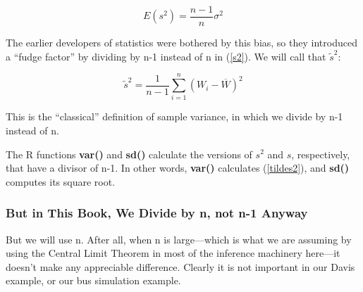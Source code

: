 % 
% 
% 
% 
% 
\begin{equation}
E(s^2) = \frac{n-1}{n} \sigma^2
\end{equation}


The earlier developers of statistics were bothered by this bias, so they
introduced a ``fudge factor'' by dividing by n-1 instead of n in
(\ref{s2}).  We will call that $\tilde{s}^2$:

\begin{equation}
\label{tildes2}
\tilde{s}^2 = 
\frac{1}{n-1} \sum_{i=1}^{n} (W_i-\overline{W})^2 
\end{equation}

This is the ``classical'' definition of sample variance, in which we
divide by n-1 instead of n.  

The R functions {\bf var()} and {\bf sd()} calculate the versions of
$s^2$ and $s$, respectively, that have a divisor of n-1.  In other
words, {\bf var()} calculates (\ref{tildes2}), and {\bf sd()} computes
its square root.

\subsubsection{But in This Book, We Divide by n, not n-1 Anyway}
\label{wearedifferent}

But we will use n.  After all, when n is large---which is
what we are assuming by using the Central Limit Theorem in most of the
inference machinery here---it doesn't make any appreciable difference.
Clearly it is not important in our Davis example, or our bus simulation
example.

